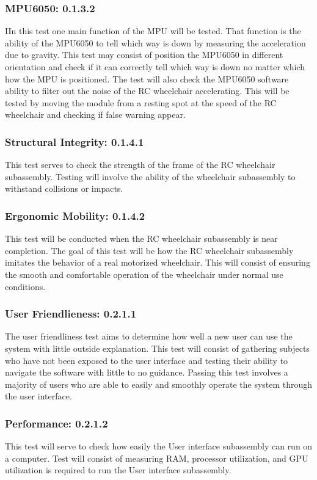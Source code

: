 \documentclass[conference]{IEEEtran}
\begin{document}
        \subsubsection{MPU6050: 0.1.3.2}
        IIn this test one main function of the MPU will be tested. That function is the ability of the MPU6050 to tell which way is down by measuring the acceleration due to gravity. This test may consist of position the MPU6050 in different orientation and check if it can correctly tell which way is down no matter which how the MPU is positioned. The test will also check the MPU6050 software ability to filter out the noise of the RC wheelchair accelerating. This will be tested by moving the module from a resting spot at the speed of the RC wheelchair and checking if false warning appear.

        \subsubsection{Structural Integrity: 0.1.4.1}
        This test serves to check the strength of the frame of the RC wheelchair subassembly. Testing will involve the ability of the wheelchair subassembly to withstand collisions or impacts. 
        
        \subsubsection{Ergonomic Mobility: 0.1.4.2}
       This test will be conducted when the RC wheelchair subassembly is near completion. The goal of this test will be how the RC wheelchair subassembly imitates the behavior of a real motorized wheelchair. This will consist of ensuring the smooth and comfortable operation of the wheelchair under normal use conditions.

        \subsubsection{User Friendlieness: 0.2.1.1}
        The user friendliness test aims to determine how well a new user can use the system with little outside explanation. This test will consist of gathering subjects who have not been exposed to the user interface and testing their ability to navigate the software with little to no guidance. Passing this test involves a majority of users who are able to easily and smoothly operate the system through the user interface.

        \subsubsection{Performance: 0.2.1.2}
        This test will serve to check how easily the User interface subassembly can run on a computer. Test will consist of measuring RAM, processor utilization, and GPU utilization is required to run the User interface subassembly. 
\end{document}
